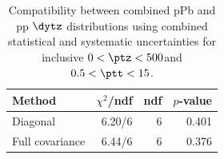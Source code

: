 \begin{table}[htp!]
\centering
\begin{tabular}{|l|r|r|r|}
\hline
Method & $\chi^2$/ndf & ndf & $p$-value \\
\hline
Diagonal & 6.20/6 & 6 & 0.401 \\
Full covariance & 6.44/6 & 6 & 0.376 \\
\hline
\end{tabular}
\caption{Compatibility between combined pPb and pp $\dytz$ distributions using combined statistical and systematic uncertainties for inclusive $0 < \ptz < 500$\GeV and $0.5 < \ptt < 15$\GeV.}
\label{table:chisq_deta}
\end{table}
